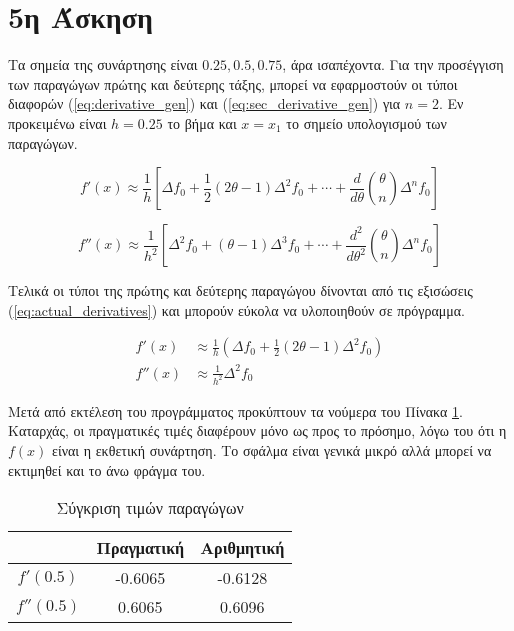 \documentclass[assignment3.tex]{subfiles}
\begin{document}
\section*{5η Άσκηση}
Τα σημεία της συνάρτησης είναι $0.25, 0.5, 0.75$, άρα ισαπέχοντα. Για την προσέγγιση των παραγώγων πρώτης και δεύτερης τάξης, μπορεί να εφαρμοστούν οι τύποι διαφορών (\ref{eq:derivative_gen}) και (\ref{eq:sec_derivative_gen}) για $n=2$. Εν προκειμένω είναι $h=0.25$ το βήμα και $x=x_1$ το σημείο υπολογισμού των παραγώγων.

\begin{equation}
f'(x)\approx \frac{1}{h}\left[\Delta f_0 + \frac{1}{2}(2\theta -1)\Delta^2f_0+\cdots + \frac{d}{d\theta}\binom{\theta}{n}\Delta^nf_0\right]
\label{eq:derivative_gen}
\end{equation}

\begin{equation}
f''(x)\approx \frac{1}{h^2}\left[\Delta^2f_0 + (\theta -1)\Delta^3f_0+\cdots + \frac{d^2}{d\theta^2}\binom{\theta}{n}\Delta^nf_0\right]
\label{eq:sec_derivative_gen}
\end{equation}

Τελικά οι τύποι της πρώτης και δεύτερης παραγώγου δίνονται από τις εξισώσεις (\ref{eq:actual_derivatives}) και μπορούν εύκολα να υλοποιηθούν σε πρόγραμμα.

\begin{equation}
\begin{split}
f'(x)&\approx\frac{1}{h}\left(\Delta f_0 + \frac{1}{2}(2\theta -1)\Delta^2f_0\right)\\
f''(x)&\approx \frac{1}{h^2}\Delta^2f_0
\end{split}
\label{eq:actual_derivatives}
\end{equation}

Μετά από εκτέλεση του προγράμματος προκύπτουν τα νούμερα του Πίνακα \ref{table:derivative_comparison}. Καταρχάς, οι πραγματικές τιμές διαφέρουν μόνο ως προς το πρόσημο, λόγω του ότι η $f(x)$ είναι η εκθετική συνάρτηση. Το σφάλμα είναι γενικά μικρό αλλά μπορεί να εκτιμηθεί και το άνω φράγμα του.

\begin{table}[ht]
	\centering
	\begin{tabular}{||c c c||} 
		\hline
		& Πραγματική & Αριθμητική \\ [0.5ex] 
		\hline\hline
		$f'(0.5)$ & -0.6065 & -0.6128 \\ 
		\hline
		$f''(0.5)$ & 0.6065 & 0.6096 \\ [1ex] 
		\hline
	\end{tabular}
	\caption{Σύγκριση τιμών παραγώγων}
	\label{table:derivative_comparison}
\end{table}
\end{document}
